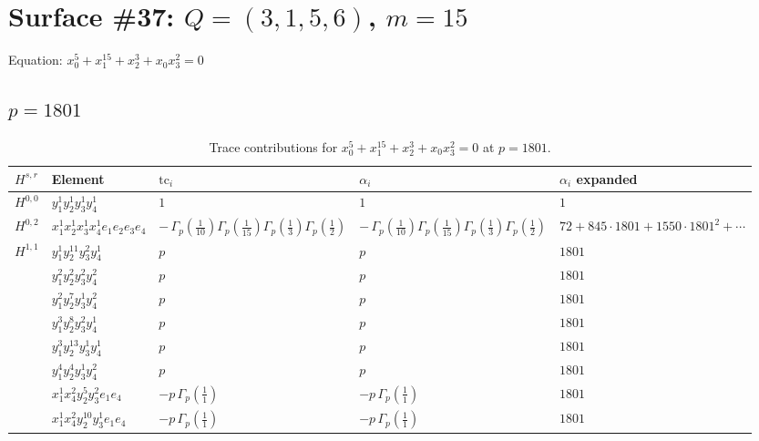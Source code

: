 \documentclass[11pt]{article}
\begin{document}
\newpage

\section*{Surface \#37: $Q=(3, 1, 5, 6)$, $m=15$}

Equation: $x_0^{5} + x_1^{15} + x_2^{3} + x_0 x_3^{2} = 0$

\subsection*{$p = 1801$}

\begin{table}[ht]
\centering
\caption{Trace contributions for $x_0^{5} + x_1^{15} + x_2^{3} + x_0 x_3^{2} = 0$ at $p=1801$.}\label{tab:deformed-37}
\renewcommand{\arraystretch}{1.1}
{\scriptsize
\begin{tabular}{@{}lllll@{}}
\toprule
$H^{s,r}$ & Element & $\mathrm{tc}_i$ & $\alpha_i$ & $\alpha_i$ expanded \\
\midrule
$H^{0,0}$ & $y_{1}^{1} y_{2}^{1} y_{3}^{1} y_{4}^{1}$ & $1$ & $1$ & $1$ \\
\midrule
$H^{0,2}$ & $x_{1}^{1} x_{2}^{1} x_{3}^{1} x_{4}^{1}  e_{1} e_{2} e_{3} e_{4}$ & $- \, \Gamma_p \left( \frac{1}{10} \right) \Gamma_p \left( \frac{1}{15} \right) \Gamma_p \left( \frac{1}{3} \right) \Gamma_p \left( \frac{1}{2} \right)$ & $- \, \Gamma_p \left( \frac{1}{10} \right) \Gamma_p \left( \frac{1}{15} \right) \Gamma_p \left( \frac{1}{3} \right) \Gamma_p \left( \frac{1}{2} \right)$ & $72{+}845{\cdot}1801{+}1550{\cdot}1801^{2}{+}\cdots$ \\
\midrule
$H^{1,1}$ & $y_{1}^{1} y_{2}^{11} y_{3}^{2} y_{4}^{1}$ & $p \,$ & $p \,$ & $1801$ \\
 & $y_{1}^{2} y_{2}^{2} y_{3}^{2} y_{4}^{2}$ & $p \,$ & $p \,$ & $1801$ \\
 & $y_{1}^{2} y_{2}^{7} y_{3}^{1} y_{4}^{2}$ & $p \,$ & $p \,$ & $1801$ \\
 & $y_{1}^{3} y_{2}^{8} y_{3}^{2} y_{4}^{1}$ & $p \,$ & $p \,$ & $1801$ \\
 & $y_{1}^{3} y_{2}^{13} y_{3}^{1} y_{4}^{1}$ & $p \,$ & $p \,$ & $1801$ \\
 & $y_{1}^{4} y_{2}^{4} y_{3}^{1} y_{4}^{2}$ & $p \,$ & $p \,$ & $1801$ \\
 & $x_{1}^{1} x_{4}^{2} y_{2}^{5} y_{3}^{2} e_{1} e_{4}$ & $- p \, \Gamma_p \left( \frac{1}{1} \right)$ & $- p \, \Gamma_p \left( \frac{1}{1} \right)$ & $1801$ \\
 & $x_{1}^{1} x_{4}^{2} y_{2}^{10} y_{3}^{1} e_{1} e_{4}$ & $- p \, \Gamma_p \left( \frac{1}{1} \right)$ & $- p \, \Gamma_p \left( \frac{1}{1} \right)$ & $1801$ \\

\end{tabular}}
\end{table}
\end{document}
